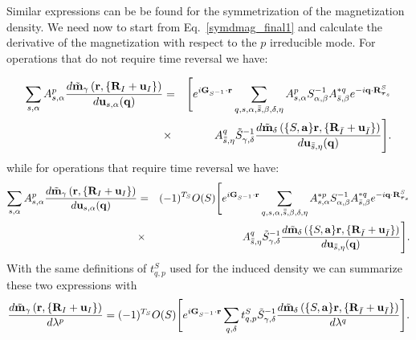 \documentclass[12pt,a4paper,twoside]{report}
\begin{document}
Similar expressions can be be found for the symmetrization of the magnetization density. We need now to start from Eq.~\ref{symdmag_final1} and calculate the derivative of the magnetization with respect to the $p$ irreducible mode. For operations that do not require time reversal we have:

\begin{eqnarray}
\sum_{s,\alpha} A^p_{s,\alpha} {d \tilde {\bf m}_\gamma \left({\bf r}, \{{\bf R}_I + {\bf u}_I\}\right)
\over d {\bf u}_{s,\alpha}({\bf q})} 
&=& \Bigg[ e^{i{\bf G}_{S^{-1}} \cdot {\bf r}}
\sum_{q,s,\alpha,\bar{\bar s},\beta,\delta,\eta} A^{p}_{s,\alpha} S^{-1}_{\alpha,\beta} A^{*q}_{\bar s,\beta} e^{-i{\bf q}\cdot {\bf R}^S_{{\boldsymbol{\tau}_s}}}
 \nonumber \\
&\times& A^{q}_{\bar {\bar s},\eta}
\tilde S^{-1}_{\gamma,\delta} {d \tilde {\bf m}_\delta\left(\{S,{\bf a}\} {\bf r}, \{{\bf R}_{\bar I} + {\bf u}_{\bar I}\}\right)
\over d {\bf u}_{\bar {\bar s},\eta} ({\bf q})} \Bigg].
\label{symdmag_final1_irrep}
\end{eqnarray}
while for operations that require time reversal we have:
\begin{eqnarray}
\sum_{s,\alpha} A^p_{s,\alpha} {d \tilde {\bf m}_\gamma \left({\bf r}, \{{\bf R}_I + {\bf u}_I\}\right)
\over d {\bf u}_{s,\alpha}({\bf q})} 
&=& (-1)^{T_{S}} O(S) \Bigg[ e^{i{\bf G}_{S^{-1}} \cdot {\bf r}}
\sum_{q,s,\alpha,\bar{\bar s},\beta,\delta,\eta} A^{*p}_{s,\alpha} S^{-1}_{\alpha,\beta} A^{*q}_{\bar s,\beta} e^{-i{\bf q}\cdot {\bf R}^S_{{\boldsymbol{\tau}_s}}}
 \nonumber \\
&\times& A^{q}_{\bar {\bar s},\eta}
\tilde S^{-1}_{\gamma,\delta} {d \tilde {\bf m}_\delta\left(\{S,{\bf a}\} {\bf r}, \{{\bf R}_{\bar I} + {\bf u}_{\bar I}\}\right)
\over d {\bf u}_{\bar {\bar s},\eta} ({\bf q})} \Bigg].
\label{symdmag_final1_irrep_tr}
\end{eqnarray}
With the same definitions of $t^S_{q,p}$ used for the induced density we can summarize these two expressions with 
\begin{equation}
{d \tilde {\bf m}_\gamma \left({\bf r}, \{{\bf R}_I + {\bf u}_I\}\right)
\over d \lambda^p} 
= (-1)^{T_{S}} O(S) \Bigg[ e^{i{\bf G}_{S^{-1}} \cdot {\bf r}}
\sum_{q,\delta} t_{q,p}^S
\tilde S^{-1}_{\gamma,\delta} {d \tilde {\bf m}_\delta\left(\{S,{\bf a}\} {\bf r}, \{{\bf R}_{\bar I} + {\bf u}_{\bar I}\}\right)
\over d \lambda^q} \Bigg].
\label{symdmag_final2_irrep_tr}
\end{equation}
\end{document}
